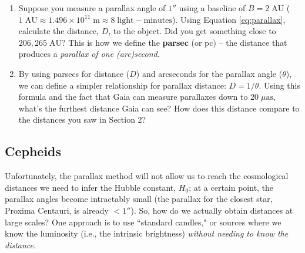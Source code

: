 \documentclass[11pt]{article}
\begin{document}
\begin{enumerate}[resume]
    \item Suppose you measure a parallax angle of $1''$ using a baseline of $B=2\;\mathrm{AU}$ ($1\;\mathrm{AU} \approx 1.496\times 10^{11}\;\mathrm{m} \approx 8\;\mathrm{light{-}minutes}$). Using Equation \ref{eq:parallax}, calculate the distance, $D$, to the object. Did you get something close to $206,265\;\mathrm{AU}$? This is how we define the \textbf{parsec} (or pc) -- the distance that produces a \emph{parallax of one (arc)second}.
    
    \item By using parsecs for distance ($D$) and arcseconds for the parallax angle ($\theta$), we can define a simpler relationship for parallax distance: $D = 1/\theta$. Using this formula and the fact that Gaia can measure parallaxes down to $20\;\mu\mathrm{as}$, what's the furthest distance Gaia can see? How does this distance compare to the distances you saw in Section 2? 
\end{enumerate}


\subsection{Cepheids}

Unfortunately, the parallax method will not allow us to reach the cosmological distances we need to infer the Hubble constant, $H_0$; at a certain point, the parallax angles become intractably small (the parallax for the closest star, Proxima Centauri, is already $<1''$). So, how do we actually obtain distances at large scales? One approach is to use ``standard candles," or sources where we know the luminosity (i.e., the intrinsic brightness) \textsl{without needing to know the distance}.
\end{document}

